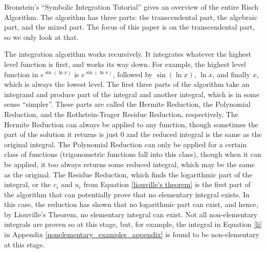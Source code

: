 Bronstein's ``Symbolic Integration Tutorial''
\cite{bronstein1998symbolic} gives an overview of the entire Risch
Algorithm.  The algorithm has three parts:  the \gls{transcendental}
part, the \gls{algebraic} part, and the mixed part.  The focus of this
paper is on the \gls{transcendental} part, so we only look at that.

The integration algorithm works recursively.  It integrates whatever the
highest level function is first, and works its way down.  For example,
the highest level function in $e^{\sin{(\ln{x})}}$ is
$e^{\sin{(\ln{x})}}$, followed by $\sin{(\ln{x})}$, $\ln{x}$, and
finally $x$, which is always the lowest level. The first three parts of
the algorithm take an \gls{integrand} and produce part of the integral
and another integral, which is in some sense ``simpler''. These parts
are called the Hermite Reduction, the Polynomial Reduction, and the
Rothstein-Trager Residue Reduction, respectively.  The Hermite Reduction
can always be applied to any function, though sometimes the part of the
solution it returns is just 0 and the reduced integral is the same as
the original integral.  The Polynomial Reduction can only be applied for
a certain class of functions (trigonometric functions fall into this
class), though when it can be applied, it too always returns some
reduced integral, which may be the same as the original.  The Residue
Reduction, which finds the logarithmic part of the integral, or the
$c_i$ and $u_i$ from Equation \ref{liouville's theorem} is the first
part of the algorithm that can potentially prove that no elementary
integral exists.  In this case, the reduction has shown that no
logarithmic part can exist, and hence, by Liouville's Theorem, no
\gls{elementary} integral can exist.  Not all non-\gls{elementary}
integrals are proven so at this stage, but, for example, the integral in
Equation \ref{li} in Appendix \ref{nonelementary_examples_appendix} is
found to be non-\gls{elementary} at this stage.

